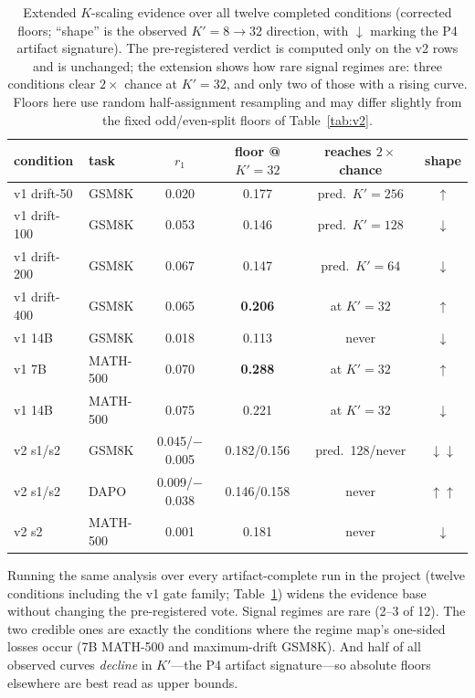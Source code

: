 \documentclass[11pt]{article}
\begin{document}
\begin{table}[t]
\centering
\caption{Extended $K$-scaling evidence over all twelve completed conditions
(corrected floors; ``shape'' is the observed $K'{=}8\!\to\!32$ direction, with
$\downarrow$ marking the P4 artifact signature). The pre-registered verdict is
computed only on the v2 rows and is unchanged; the extension shows how rare
signal regimes are: three conditions clear $2\times$ chance at $K'{=}32$, and
only two of those with a rising curve. Floors here use random half-assignment
resampling and may differ slightly from the fixed odd/even-split floors of
Table~\ref{tab:v2}.}
\label{tab:kcurve-ext}
\begin{tabular}{llcccc}
\toprule
condition & task & $r_1$ & floor @ $K'{=}32$ & reaches $2\times$ chance & shape\\
\midrule
v1 drift-50 & GSM8K & 0.020 & 0.177 & pred.\ $K'{=}256$ & $\uparrow$\\
v1 drift-100 & GSM8K & 0.053 & 0.146 & pred.\ $K'{=}128$ & $\downarrow$\\
v1 drift-200 & GSM8K & 0.067 & 0.147 & pred.\ $K'{=}64$ & $\downarrow$\\
v1 drift-400 & GSM8K & 0.065 & \textbf{0.206} & at $K'{=}32$ & $\uparrow$\\
v1 14B & GSM8K & 0.018 & 0.113 & never & $\downarrow$\\
v1 7B & MATH-500 & 0.070 & \textbf{0.288} & at $K'{=}32$ & $\uparrow$\\
v1 14B & MATH-500 & 0.075 & 0.221 & at $K'{=}32$ & $\downarrow$\\
v2 s1/s2 & GSM8K & 0.045/$-$0.005 & 0.182/0.156 & pred.\ 128/never & $\downarrow\downarrow$\\
v2 s1/s2 & DAPO & 0.009/$-$0.038 & 0.146/0.158 & never & $\uparrow\uparrow$\\
v2 s2 & MATH-500 & 0.001 & 0.181 & never & $\downarrow$\\
\bottomrule
\end{tabular}
\end{table}

Running the same analysis over every artifact-complete run in the project
(twelve conditions including the v1 gate family; Table~\ref{tab:kcurve-ext})
widens the evidence base without changing the pre-registered vote. Signal
regimes are rare (2--3 of 12). The two credible ones are exactly the
conditions where the regime map's one-sided losses occur (7B MATH-500 and
maximum-drift GSM8K). And half of all observed curves \emph{decline} in
$K'$---the P4 artifact signature---so absolute floors elsewhere are best
read as upper bounds.
\end{document}
